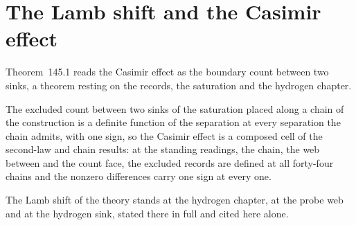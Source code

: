 \section{The Lamb shift and the Casimir effect}\label{mod:V-5-lamb-shift-and-the-casimir-effect}
\label{narr:open:5-5}Theorem~145.1 reads the Casimir effect as the boundary count between two sinks, a theorem resting on the records, the saturation and the hydrogen chapter.
\begin{chtheorem}\label{box:V-5-lamb-shift-and-the-casimir-effect:1}
The excluded count between two sinks of the saturation placed along a chain of the construction is a definite function of the separation at every separation the chain admits, with one sign, so the Casimir effect is a composed cell of the second-law and chain results: at the standing readings, the chain, the web between and the count face, the excluded records are defined at all forty-four chains and the nonzero differences carry one sign at every one.
\end{chtheorem}
The Lamb shift of the theory stands at the hydrogen chapter, at the probe web and at the hydrogen sink, stated there in full and cited here alone.
